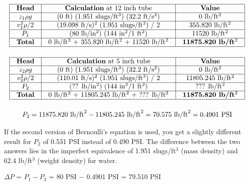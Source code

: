 






$$\vbox{\offinterlineskip
\halign{\strut
\vrule \quad\hfil # \ \hfil & 
\vrule \quad\hfil # \ \hfil & 
\vrule \quad\hfil # \ \hfil \vrule \cr
\noalign{\hrule}
%
{\bf Head} & {\bf Calculation} at 12 inch tube & {\bf Value} \cr
%
\noalign{\hrule}
%
$z_1 \rho g$ & (0 ft) (1.951 slugs/ft$^{3}$) (32.2 ft/s$^{2}$) & 0 lb/ft$^{2}$ \cr
%
\noalign{\hrule}
%
$v_1^2 \rho / 2$ & (19.098 ft/s)$^{2}$ (1.951 slugs/ft$^{3}$) / 2 & 355.820 lb/ft$^{2}$ \cr
%
\noalign{\hrule}
%
$P_1$ & (80 lb/in$^{2}$) (144 in$^{2}$/1 ft$^{2}$) & 11520 lb/ft$^{2}$ \cr
%
\noalign{\hrule}
%
{\bf Total} &  0 lb/ft$^{2}$ + 355.820 lb/ft$^{2}$ + 11520 lb/ft$^{2}$ & {\bf 11875.820 lb/ft$^{2}$} \cr
%
\noalign{\hrule}
} %
}$$ %

\vskip 10pt


$$\vbox{\offinterlineskip
\halign{\strut
\vrule \quad\hfil # \ \hfil & 
\vrule \quad\hfil # \ \hfil & 
\vrule \quad\hfil # \ \hfil \vrule \cr
\noalign{\hrule}
%
{\bf Head} & {\bf Calculation} at 5 inch tube & {\bf Value} \cr
%
\noalign{\hrule}
%
$z_2 \rho g$ & (0 ft) (1.951 slugs/ft$^{3}$) (32.2 ft/s$^{2}$) & 0 lb/ft$^{2}$ \cr
%
\noalign{\hrule}
%
$v_2^2 \rho / 2$ & (110.01 ft/s)$^{2}$ (1.951 slugs/ft$^{3}$) / 2 & 11805.245 lb/ft$^{2}$ \cr
%
\noalign{\hrule}
%
$P_2$ & (?? lb/in$^{2}$) (144 in$^{2}$/1 ft$^{2}$) & ??? lb/ft$^{2}$ \cr
%
\noalign{\hrule}
%
{\bf Total} &  0 lb/ft$^{2}$ + 11805.245 lb/ft$^{2}$ + ??? lb/ft$^{2}$ & {\bf 11875.820 lb/ft$^{2}$} \cr
%
\noalign{\hrule}
} %
}$$ %

$$P_2 = 11875.820 \hbox{ lb/ft}^2 - 11805.245 \hbox{ lb/ft}^2 = 70.575 \hbox{ lb/ft}^2 = 0.4901 \hbox{ PSI}$$

\vskip 10pt

If the second version of Bernoulli's equation is used, you get a slightly different result for $P_2$ of 0.531 PSI instead of 0.490 PSI.  The difference between the two answers lies in the imperfect equivalence of 1.951 slugs/ft$^{3}$ (mass density) and 62.4 lb/ft$^{3}$ (weight density) for water.

\vskip 10pt

$\Delta P$ = $P_1 - P_2$ = 80 PSI $-$ 0.4901 PSI = 79.510 PSI




